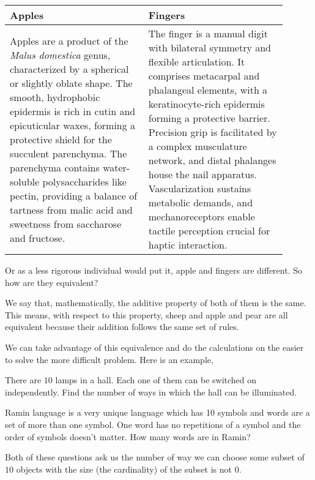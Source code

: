 \begin{table}[H]
    \centering
    \begin{tabular}{|p{0.45\linewidth}|p{0.45\linewidth}|}
        \hline
        \textbf{Apples} & \textbf{Fingers} \\
        \hline
        Apples are a product of the \textit{Malus domestica} genus, 
        characterized by a spherical or slightly oblate shape. The smooth,
         hydrophobic epidermis is rich in cutin and epicuticular waxes, 
         forming a protective shield for the succulent parenchyma. 
         The parenchyma contains water-soluble polysaccharides like pectin, 
         providing a balance of tartness from malic acid and sweetness from 
         saccharose and fructose. & 
         The finger is a manual digit with bilateral symmetry and flexible articulation. 
         It comprises metacarpal and phalangeal elements, with a keratinocyte-rich epidermis 
         forming a protective barrier. Precision grip is facilitated by a complex musculature 
         network, and distal phalanges house the nail apparatus. Vascularization sustains metabolic 
         demands, and mechanoreceptors enable tactile perception crucial for haptic interaction. \\
        \hline
    \end{tabular}
\end{table}

Or as a less rigorous individual would put it, apple and fingers are different.
So how are they equivalent?

We say that, mathematically, the additive property of both of them is the same. This means, 
with respect to this property, sheep and apple and pear are all equivalent because their addition 
follows the same set of rules. 

We can take advantage of this equivalence and do the calculations on the easier to solve 
the more difficult problem. Here is an example,

\begin{example}
There are \(10\) lamps in a hall. Each one of them can be switched on independently.
Find the number of ways in which the hall can be illuminated.    
\end{example}

\begin{example}
    Ramin language is a very unique language which has 10 symbols and words are a set of more than one symbol. 
    One word has no repetitions of a symbol and the order of symbols doesn't matter. How many words are in Ramin?
\end{example}
Both of these questions ask us the number of way we can choose some subset of \(10\) objects with the size
(the cardinality) of the subset is not \(0\).


